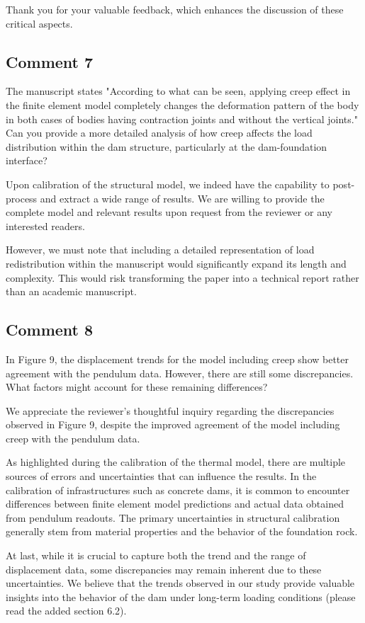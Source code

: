 \documentclass{ar2rc}
\begin{document}
	Thank you for your valuable feedback, which enhances the discussion of these critical aspects.
	
	\subsection{Comment 7}
	\RC The manuscript states "According to what can be seen, applying creep effect in the finite element model completely changes the deformation pattern of the body in both cases of bodies having contraction joints and without the vertical joints." Can you provide a more detailed analysis of how creep affects the load distribution within the dam structure,	particularly at the dam-foundation interface?
	
	\AR Upon calibration of the structural model, we indeed have the capability to post-process and extract a wide range of results. We are willing to provide the complete model and relevant results upon request from the reviewer or any interested readers.
	
	However, we must note that including a detailed representation of load redistribution within the manuscript would significantly expand its length and complexity. This would risk transforming the paper into a technical report rather than an academic manuscript.
		
	\subsection{Comment 8}
	\RC In Figure 9, the displacement trends for the model including creep show better agreement with the pendulum data. However, there are still some discrepancies. What factors might account for these remaining differences?
		
	\AR We appreciate the reviewer’s thoughtful inquiry regarding the discrepancies observed in Figure 9, despite the improved agreement of the model including creep with the pendulum data.
	
	As highlighted during the calibration of the thermal model, there are multiple sources of errors and uncertainties that can influence the results. In the calibration of infrastructures such as concrete dams, it is common to encounter differences between finite element model predictions and actual data obtained from pendulum readouts. The primary uncertainties in structural calibration generally stem from material properties and the behavior of the foundation rock.
	
	At last, while it is crucial to capture both the trend and the range of displacement data, some discrepancies may remain inherent due to these uncertainties. We believe that the trends observed in our study provide valuable insights into the behavior of the dam under long-term loading conditions (please read the added section 6.2).
	
\end{document}
